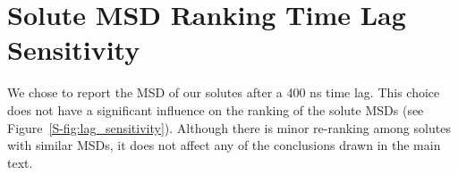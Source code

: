 %  
%  
%  
%  

  \section{Solute MSD Ranking Time Lag Sensitivity}\label{S-section:lag_sensitivity}
  
  We chose to report the MSD of our solutes after a 400 ns time lag. This choice does
  not have a significant influence on the ranking of the solute MSDs (see 
  Figure~\ref{S-fig:lag_sensitivity}). Although there is minor re-ranking among solutes
  with similar MSDs, it does not affect any of the conclusions drawn in the main text.
  
